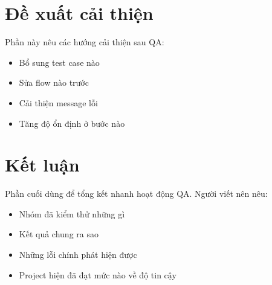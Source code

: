 \documentclass[12pt]{ai_conquer2026}
\begin{document}
\section{Đề xuất cải thiện}

Phần này nêu các hướng cải thiện sau QA:
\begin{itemize}
    \item Bổ sung test case nào
    \item Sửa flow nào trước
    \item Cải thiện message lỗi
    \item Tăng độ ổn định ở bước nào
\end{itemize}

\section{Kết luận}

Phần cuối dùng để tổng kết nhanh hoạt động QA. Người viết nên nêu:
\begin{itemize}
    \item Nhóm đã kiểm thử những gì
    \item Kết quả chung ra sao
    \item Những lỗi chính phát hiện được
    \item Project hiện đã đạt mức nào về độ tin cậy
\end{itemize}

\newpage

\nocite{*}
\vspace{-3.2em}
\end{document}
